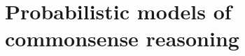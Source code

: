 \documentclass[12pt]{article}
\begin{document}
\section{Probabilistic models of commonsense reasoning}
\label{commonsense}


  
  
  
  
%  
  
 
\end{document}
